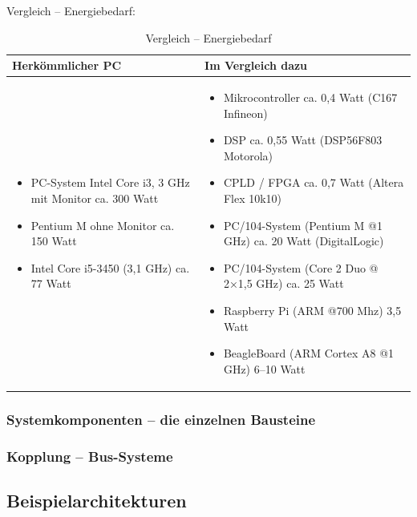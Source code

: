 Vergleich – Energiebedarf:
\begin{table}[hbt]
\centering
\begin{tabular}{|p{5cm}|p{11cm}|}
\hline
\textbf{Herkömmlicher PC} & \textbf{Im Vergleich dazu} \\
\hline
\hline
\begin{itemize}
\item PC-System Intel Core i3, 3 GHz mit Monitor ca. 300 Watt
\item Pentium M ohne Monitor ca. 150 Watt
\item Intel Core i5-3450 (3,1 GHz) ca. 77 Watt
\end{itemize} &
\begin{itemize}
\item Mikrocontroller ca. 0,4 Watt (C167 Infineon)
\item DSP ca. 0,55 Watt (DSP56F803 Motorola)
\item CPLD / FPGA ca. 0,7 Watt (Altera Flex 10k10)
\item PC/104-System (Pentium M @1 GHz) ca. 20 Watt (DigitalLogic)
\item PC/104-System (Core 2 Duo @ 2×1,5 GHz) ca. 25 Watt
\item Raspberry Pi (ARM @700 Mhz) 3,5 Watt
\item BeagleBoard (ARM Cortex A8 @1 GHz) 6–10 Watt
\end{itemize}\\
\hline
\end{tabular}
\caption{Vergleich – Energiebedarf}
\label{tab:energie}
\end{table}
\subsubsection{Systemkomponenten – die einzelnen Bausteine}
\subsubsection{Kopplung – Bus-Systeme}
\subsection{Beispielarchitekturen}





